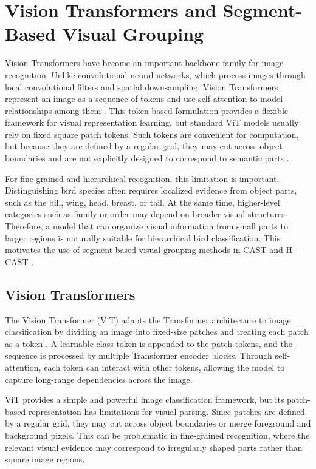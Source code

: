 \section{Vision Transformers and Segment-Based Visual Grouping}

Vision Transformers have become an important backbone family for image recognition. Unlike convolutional neural networks, which process images through local convolutional filters and spatial downsampling, Vision Transformers represent an image as a sequence of tokens and use self-attention to model relationships among them \cite{dosovitskiy2020image}. This token-based formulation provides a flexible framework for visual representation learning, but standard ViT models usually rely on fixed square patch tokens. Such tokens are convenient for computation, but because they are defined by a regular grid, they may cut across object boundaries and are not explicitly designed to correspond to semantic parts \cite{ke2024learning,park2025visually}. 

For fine-grained and hierarchical recognition, this limitation is important. Distinguishing bird species often requires localized evidence from object parts, such as the bill, wing, head, breast, or tail. At the same time, higher-level categories such as family or order may depend on broader visual structures. Therefore, a model that can organize visual information from small parts to larger regions is naturally suitable for hierarchical bird classification. This motivates the use of segment-based visual grouping methods in CAST \cite{ke2024learning} and H-CAST \cite{park2025visually}.


\subsection{Vision Transformers}

The Vision Transformer (ViT) adapts the Transformer architecture \cite{vaswani2017attention} to image classification by dividing an image into fixed-size patches and treating each patch as a token \cite{dosovitskiy2020image}. A learnable class token is appended to the patch tokens, and the sequence is processed by multiple Transformer encoder blocks. Through self-attention, each token can interact with other tokens, allowing the model to capture long-range dependencies across the image.

ViT provides a simple and powerful image classification framework, but its patch-based representation has limitations for visual parsing. Since patches are defined by a regular grid, they may cut across object boundaries or merge foreground and background pixels. This can be problematic in fine-grained recognition, where the relevant visual evidence may correspond to irregularly shaped parts rather than square image regions.

